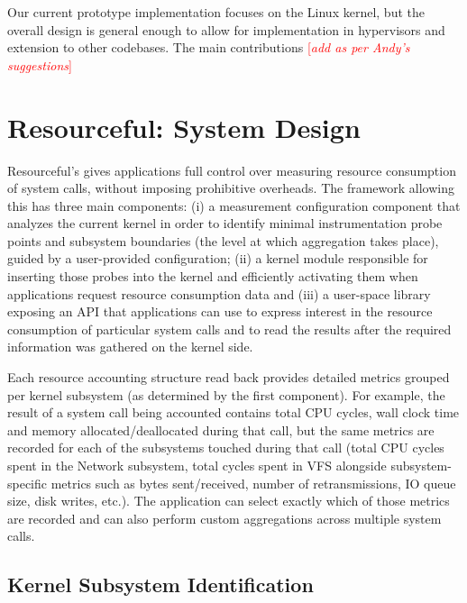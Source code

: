 \documentclass[letterpaper,twocolumn,10pt]{article}
\newcommand{\pname}{Resourceful}
\newcommand{\lnote}[1]{\textcolor{red}{[\textit{#1}]}} %
\begin{document}
Our current prototype implementation focuses on the Linux kernel, but the overall design is general enough to allow for implementation in hypervisors and extension to other codebases. The main contributions \lnote{add as per Andy's suggestions}

\section{\pname: System Design}
\pname's gives applications full control over measuring resource consumption of system calls, without imposing prohibitive overheads. The framework allowing this has three main components: (i) a measurement configuration component that analyzes the current kernel in order to identify minimal instrumentation probe points and subsystem boundaries (the level at which aggregation takes place), guided by a user-provided configuration; (ii) a kernel module responsible for inserting those probes into the kernel and efficiently activating them when applications request resource consumption data and (iii) a user-space library exposing an API that applications can use to express interest in the resource consumption of particular system calls and to read the results after the required information was gathered on the kernel side.

Each resource accounting structure read back provides detailed metrics grouped per kernel subsystem (as determined by the first component). For example, the result of a system call being accounted contains total CPU cycles, wall clock time and memory allocated/deallocated during that call, but the same metrics are recorded for each of the subsystems touched during that call (total CPU cycles spent in the Network subsystem, total cycles spent in VFS alongside subsystem-specific metrics such as bytes sent/received, number of retransmissions, IO queue size, disk writes, etc.). The application can select exactly which of those metrics are recorded and can also perform custom aggregations across multiple system calls.

\subsection{Kernel Subsystem Identification}
\end{document}
